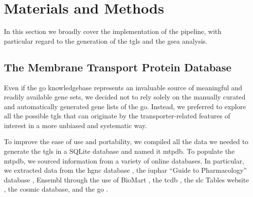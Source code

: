 \section{Materials and Methods}

In this section we broadly cover the implementation of the pipeline, with
particular regard to the generation of the \glspl{tgl} and the \gls{gsea}
analysis.



\subsection{The Membrane Transport Protein Database}

Even if the \gls{go} knowledgebase \cite{ashburnerGeneOntologyTool2000,
thegeneontologyconsortiumGeneOntologyKnowledgebase2023} represents an invaluable
source of meaningful and readily available gene sets, we decided not to rely solely on the manually curated and
automatically generated gene lists of the \gls{go}. Instead, we preferred to
explore all the possible \glspl{tgl} that can originate by the
transporter-related features of interest in a more unbiased and systematic way.

To improve the ease of use and portability, we compiled all the data we needed
to generate the \glspl{tgl} in a SQLite database and named it \gls{mtpdb}. To
populate the \gls{mtpdb}, we sourced information from a variety of online
databases. In particular, we extracted data from
the \gls{hgnc} database \cite{sealGenenamesOrgHGNC2023},
the \gls{iuphar} ``Guide to Pharmacology'' database \cite{hardingIUPHARBPSGuide2022},
Ensembl \cite{cunninghamEnsembl20222022} through the use of BioMart \cite{smedleyBioMartBiologicalQueries2009},
the \gls{tcdb} \cite{saierTransporterClassificationDatabase2021},
the \gls{slc} Tables website \cite{hedigerABCsMembraneTransporters2013},
the \gls{cosmic} \cite{tateCOSMICCatalogueSomatic2019} database,
and the \gls{go} \cite{ashburnerGeneOntologyTool2000, thegeneontologyconsortiumGeneOntologyKnowledgebase2023}.

